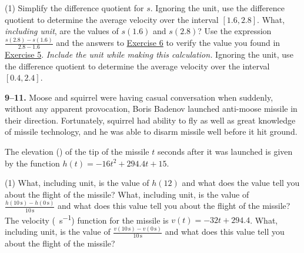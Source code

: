 \documentclass[10pt,oneside,]{book}
\theoremstyle{plain}
\theoremstyle{definition}
\numberwithin{equation}{section}
\newcommand{\fe}[2]{#1\mathopen{}\left(#2\right)\mathclose{}}
\newcommand{\cinterval}[2]{\left[#1,#2\right]}
\begin{document}
\begin{exercisegroup}(1)
\exercise[4.]\hypertarget{exercise-12}{\null}Simplify the difference quotient for \(s\).%
\exercise[5.]\hypertarget{exercise-difference-quotient-average-velocity}{\null}Ignoring the unit, use the difference quotient to determine the average velocity over the interval \(\cinterval{1.6}{2.8}\).%
\exercise[6.]\hypertarget{exercise-difference-quotient-values}{\null}What, \emph{including unit}, are the values of \(\fe{s}{1.6}\) and \(\fe{s}{2.8}\)?%
\exercise[7.]\hypertarget{exercise-difference-quotient-verify}{\null}Use the expression \(\frac{\fe{s}{2.8}-\fe{s}{1.6}}{2.8-1.6}\) and the answers to \hyperlink{exercise-difference-quotient-values}{Exercise 6} to verify the value you found in \hyperlink{exercise-difference-quotient-average-velocity}{Exercise 5}. \emph{Include the unit while making this calculation.}%
\exercise[8.]\hypertarget{exercise-16}{\null}Ignoring the unit, use the difference quotient to determine the average velocity over the interval \(\cinterval{0.4}{2.4}\).%
\end{exercisegroup}
\par\smallskip\noindent
\textbf{9--11. }\hypertarget{exercisegroup-5}{\null}Moose and squirrel were having casual conversation when suddenly, without any apparent provocation, Boris Badenov launched anti-moose missile in their direction. Fortunately, squirrel had ability to fly as well as great knowledge of missile technology, and he was able to disarm missile well before it hit ground.%
\par
The elevation (\si{\foot}) of the tip of the missile \(t\) seconds after it was launched is given by the function \(\fe{h}{t}=-16t^2+294.4t+15\).%
\par
\begin{exercisegroup}(1)
\exercise[9.]\hypertarget{exercise-17}{\null}What, including unit, is the value of \(\fe{h}{12}\) and what does the value tell you about the flight of the missile?%
\exercise[10.]\hypertarget{exercise-18}{\null}What, including unit, is the value of \(\frac{\fe{h}{10\,\text{s}}-\fe{h}{0\,\text{s}}}{10\,\text{s}}\) and what does this value tell you about the flight of the missile?%
\exercise[11.]\hypertarget{exercise-19}{\null}The velocity (\si{\foot\per\second}) function for the missile is \(\fe{v}{t}=-32t+294.4\). What, including unit, is the value of \(\frac{\fe{v}{10\,\text{s}}-\fe{v}{0\,\text{s}}}{10\,\text{s}}\) and what does this value tell you about the flight of the missile?%
\end{exercisegroup}
\end{document}
